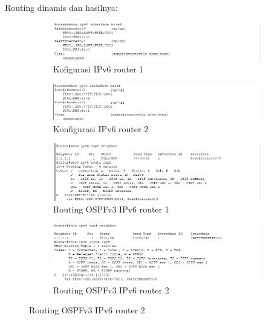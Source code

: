 Routing dinamis dan hasilnya:
\begin{figure}[H]
	\centering
		\begin{subfigure}[b]{0.4\linewidth}
			\centering
			\includegraphics[width=\linewidth]{P2/img/tumod (9).png}
			\caption{Kofigurasi IPv6 router 1\label{fig:konfigurasiR1}}
		\end{subfigure}
		\begin{subfigure}[b]{0.4\linewidth}
			\centering
			\includegraphics[width=\linewidth]{P2/img/tumod (11).png}
			\caption{Konfigurasi IPv6 router 2\label{fig:konfigurasiR2}}
		\end{subfigure}
		\hspace{1cm}
		\begin{subfigure}[b]{0.4\linewidth}
			\centering
			\includegraphics[width=\linewidth]{P2/img/tumod (2).png}
			\caption{Routing OSPFv3 IPv6 router 1\label{fig:routingR1}}
		\end{subfigure}
		\begin{subfigure}[b]{0.4\linewidth}
			\centering
			\includegraphics[width=\linewidth]{P2/img/tumod (3).png}
			\caption{Routing OSPFv3 IPv6 router 2\label{fig:routingR2}}
		\end{subfigure}

\end{figure}
